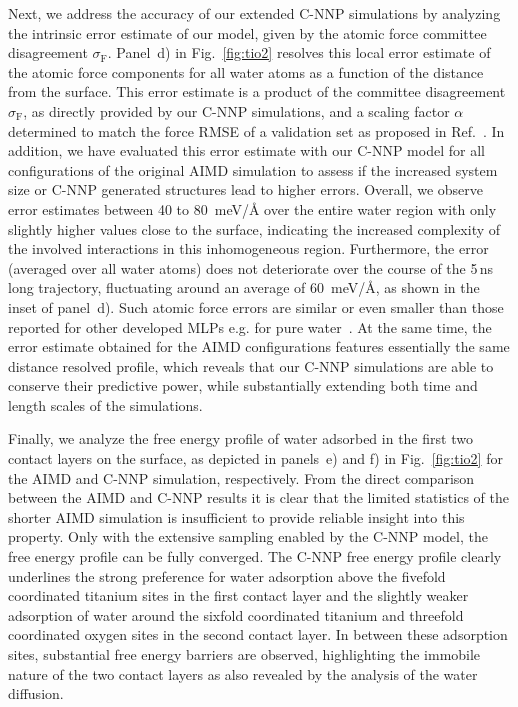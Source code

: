 \documentclass[aip,jcp,amsmath,amssymb,floatfix,reprint,citeautoscript,noeprint]{revtex4-1}
\begin{document}
\begin{bibunit}
%
Next, we address the accuracy of our extended
C-NNP simulations by analyzing the intrinsic error
estimate of our model, given by the atomic force committee disagreement
$\sigma_\text{F}$.
%
Panel~d) in Fig.~\ref{fig:tio2} resolves this local error
estimate of the atomic force components for all water atoms as a function of the distance from the surface.
%
This error estimate is a product of the committee disagreement $\sigma_\text{F}$, as directly provided by our C-NNP simulations, and a scaling factor $\alpha$ determined to match the force RMSE of a validation set as proposed in Ref.~.
%
In addition, we have evaluated this error estimate with our C-NNP model for all configurations of the original AIMD simulation to assess if the increased system size or C-NNP generated structures lead to higher errors.
%
Overall, we observe error estimates between 40 to 80~meV/\AA{} over the entire
water region with only slightly higher values
close to the  surface, indicating the
increased complexity of the involved interactions
in this inhomogeneous region.
%
Furthermore, the error (averaged over all water atoms) does not deteriorate over the course of the 5\,ns long trajectory, fluctuating around an average of 60~meV/\AA{}, as shown in the inset of panel~d).
%
Such atomic force errors are similar or even smaller than those reported for other developed MLPs e.g. for pure water~\cite{Morawietz2016/10.1073/pnas.1602375113,Cheng2019/10.1073/pnas.1815117116,Gartner2020/10.1073/pnas.2015440117,Schran2020/10.1063/5.0016004}.
%
At the same time, the error estimate obtained for the
AIMD configurations features essentially the same distance resolved profile,
which reveals that our C-NNP simulations are
able to conserve their predictive power, while
substantially extending both time and length scales
of the simulations.

%
Finally, we analyze the free energy profile of water adsorbed in the first two contact layers on the  surface, as depicted in panels~e) and f) in Fig.~\ref{fig:tio2} for the AIMD and C-NNP simulation, respectively.
%
From the direct comparison between the AIMD and C-NNP results it is clear that the limited statistics of the shorter AIMD simulation is insufficient to provide reliable insight into this property.
%
Only with the extensive sampling enabled by the C-NNP model, the free energy profile can be fully converged.
%
The C-NNP free energy profile clearly underlines the strong preference for water adsorption above the fivefold coordinated titanium sites in the first contact layer and the slightly weaker adsorption of water around the sixfold coordinated titanium and threefold coordinated oxygen sites in the second contact layer.
%
In between these adsorption sites, substantial free energy barriers are observed, highlighting the immobile nature of the two contact layers as also revealed by the analysis of the water diffusion.
%



\end{bibunit}
\end{document}
